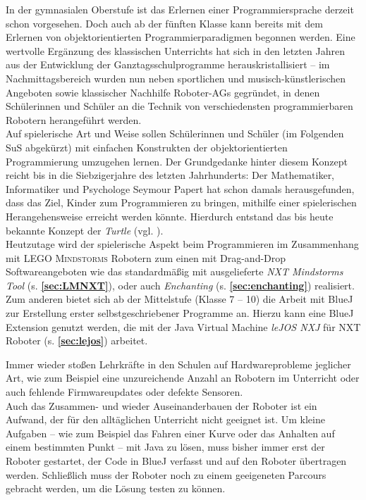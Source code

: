 \documentclass[paper=a4, DIV=calc, BCOR=15mm, twoside=on, onecolumn=on, open = right, titlepage =on, parskip =half, headsepline = on, footsepline = on, chapterprefix = off, appendixprefix = off, fontsize = 12pt, numbers = noenddot, abstract = on]{scrbook}
\begin{document}
In der gymnasialen Oberstufe ist das Erlernen einer Programmiersprache derzeit schon vorgesehen. Doch auch ab der fünften Klasse kann bereits mit dem Erlernen von objektorientierten Programmierparadigmen begonnen werden. Eine wertvolle Ergänzung des klassischen Unterrichts hat sich in den letzten Jahren aus der Entwicklung der Ganztagsschulprogramme herauskristallisiert -- im Nachmittagsbereich wurden nun neben sportlichen und musisch-künstlerischen Angeboten sowie klassischer Nachhilfe Roboter-AGs gegründet, in denen Schülerinnen und Schüler an die Technik von verschiedensten programmierbaren Robotern herangeführt werden.\\
Auf spielerische Art und Weise sollen Schülerinnen und Schüler (im Folgenden SuS abgekürzt) mit einfachen Konstrukten der objektorientierten Programmierung umzugehen lernen. Der Grundgedanke hinter diesem Konzept reicht bis in die Siebzigerjahre des letzten Jahrhunderts: Der Mathematiker, Informatiker und Psychologe Seymour Papert hat schon damals herausgefunden, dass das Ziel, Kinder zum Programmieren zu bringen, mithilfe einer spielerischen Herangehensweise erreicht werden könnte. Hierdurch entstand das bis heute bekannte Konzept der \emph{Turtle} (vgl. \cite[S.365]{nievergelt:99}).\\
Heutzutage wird der spielerische Aspekt beim Programmieren im Zusammenhang mit \textsc{LEGO Mindstorms} Robotern zum einen mit Drag-and-Drop Softwareangeboten wie das standardmäßig mit ausgelieferte \emph{NXT Mindstorms Tool} (s.  \textbf{\ref{sec:LMNXT}}), oder auch \emph{Enchanting} (s. \textbf{\ref{sec:enchanting}}) realisiert. Zum anderen bietet sich ab der Mittelstufe (Klasse 7 -- 10) die Arbeit mit BlueJ zur Erstellung erster selbstgeschriebener Programme an. Hierzu kann eine BlueJ Extension genutzt werden, die mit der Java Virtual Machine \emph{leJOS NXJ} für NXT Roboter (s. \textbf{\ref{sec:lejos}}) arbeitet.

Immer wieder stoßen Lehrkräfte in den Schulen auf Hardwareprobleme jeglicher Art, wie zum Beispiel eine unzureichende Anzahl an Robotern im Unterricht oder auch fehlende Firmwareupdates oder defekte Sensoren.\\
Auch das Zusammen- und wieder Auseinanderbauen der Roboter ist ein Aufwand, der für den alltäglichen Unterricht nicht geeignet ist. Um kleine Aufgaben -- wie zum Beispiel das Fahren einer Kurve oder das Anhalten auf einem bestimmten Punkt -- mit Java zu lösen, muss bisher immer erst der Roboter gestartet, der Code in BlueJ verfasst und auf den Roboter übertragen werden. Schließlich muss der Roboter noch zu einem geeigeneten Parcours gebracht werden, um die Lösung testen zu können.
\end{document}
